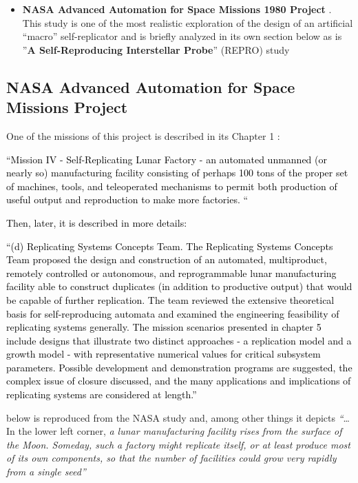 \documentclass[letterpaper]{article}
\begin{document}
\bigskip

\begin{itemize}
\item \textbf{NASA Advanced Automation for Space Missions 1980 Project}
. This study is one of the most realistic exploration of the design of
an artificial “macro” self-replicator and is briefly analyzed in its
own section below as is ”\textbf{A Self-Reproducing Interstellar
Probe}” (REPRO) study 
\end{itemize}

\bigskip

\subsection[NASA Advanced Automation for Space Missions Project]{NASA
Advanced Automation for Space Missions Project}
\hypertarget{RefHeading3154306210128}{}One of the missions of this
project is described in its Chapter 1 :

\textcolor{black}{“Mission IV - Self-Replicating Lunar Factory - an
automated unmanned (or nearly so) manufacturing facility consisting of
perhaps 100 tons of the proper set of machines, tools, and teleoperated
mechanisms to permit both production of useful output and reproduction
to make more factories. “}

\textcolor{black}{Then, later, it is described in more details:}

\textcolor{black}{“(d) Replicating Systems Concepts Team. The
Replicating Systems Concepts Team proposed the design and construction
of an automated, multiproduct, remotely controlled or autonomous, and
reprogrammable lunar manufacturing facility able to construct
duplicates (in addition to productive output) that would be capable of
further replication. The team reviewed the extensive theoretical basis
for self-reproducing automata and examined the engineering feasibility
of replicating systems generally. The mission scenarios presented in
chapter 5 include designs that illustrate two distinct approaches - a
replication model and a growth model - with representative numerical
values for critical subsystem parameters. Possible development and
demonstration programs are suggested, the complex issue of closure
discussed, and the many applications and implications of replicating
systems are considered at length.” }

 below is reproduced from the NASA study and, among other things it
depicts \textit{“}…In the lower left corner, \textit{a lunar
manufacturing facility rises from the surface of the Moon. Someday,
such a factory might replicate itself, or at least produce most of its
own components, so that the number of facilities could grow very
rapidly from a single seed” }
\end{document}
